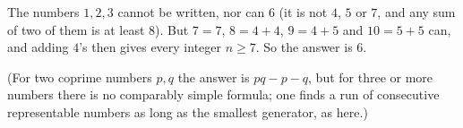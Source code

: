 The numbers $1,2,3$ cannot be written, nor can $6$ (it is not $4$, $5$ or $7$, and any sum of two of them is at least $8$). But $7=7$, $8=4+4$, $9=4+5$ and $10=5+5$ can, and adding $4$'s then gives every integer $n\ge7$. So the answer is $\boxed{6}$.

(For two coprime numbers $p,q$ the answer is $pq-p-q$, but for three or more numbers there is no comparably simple formula; one finds a run of consecutive representable numbers as long as the smallest generator, as here.)
